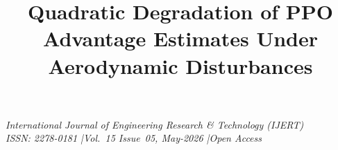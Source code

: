 \documentclass[10pt, conference]{IEEEtran}
\begin{document}
\begin{center}
  {\small\itshape International Journal of Engineering Research \& Technology
  (IJERT)}\\[2pt]
  {\small\itshape ISSN: 2278-0181 \quad|\quad Vol.~15 Issue~05,
  May-2026 \quad|\quad Open Access}
\end{center}
\vspace{4pt}

\title{Quadratic Degradation of PPO Advantage Estimates Under Aerodynamic Disturbances}

\author{
  \and
}

\maketitle
\end{document}
